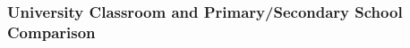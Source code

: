 \subsubsection{University Classroom and Primary/Secondary School Comparison}
\label{sec:primsecvsuniclassroom}
